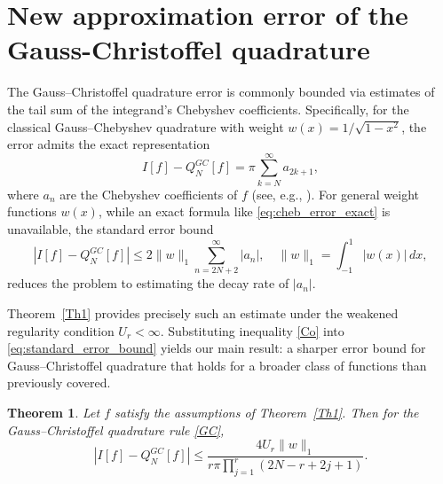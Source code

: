 \documentclass[12pt,a4paper]{article}
\newtheorem{theorem}{Theorem}[section]
\begin{document}
\section{New approximation error of the Gauss-Christoffel quadrature}\label{sec3}
The Gauss--Christoffel quadrature error is commonly bounded via estimates of the tail sum of the integrand's Chebyshev coefficients. Specifically, for the classical Gauss--Chebyshev quadrature with weight $w(x) = 1/\sqrt{1-x^2}$, the error admits the exact representation
\begin{equation}\label{eq:cheb_error_exact}
I[f] - Q_N^{GC}[f] = \pi \sum_{k=N}^{\infty} a_{2k+1},
\end{equation}
where $a_n$ are the Chebyshev coefficients of $f$ (see, e.g., \cite{LN,Rab}). For general weight functions $w(x)$, while an exact formula like \eqref{eq:cheb_error_exact} is unavailable, the standard error bound \cite[Theorem 3.1]{Xi}
\begin{equation}\label{eq:standard_error_bound}
|I[f] - Q_N^{GC}[f]| \leq 2 \|w\|_1 \sum_{n=2N+2}^{\infty} |a_n|, \quad \|w\|_1 = \int_{-1}^{1} |w(x)|\,dx,
\end{equation}
reduces the problem to estimating the decay rate of $|a_n|$.

Theorem~\ref{Th1} provides precisely such an estimate under the weakened regularity condition $U_r < \infty$. Substituting inequality \eqref{Co} into \eqref{eq:standard_error_bound} yields our main result: a sharper error bound for Gauss--Christoffel quadrature that holds for a broader class of functions than previously covered.

\begin{theorem}\label{T2}
    Let $f$ satisfy the assumptions of Theorem~\ref{Th1}. Then for the Gauss--Christoffel quadrature rule \eqref{GC},
    \begin{equation}\label{eq:new_quad_bound}
    |I[f] - Q_N^{GC}[f]| \leq \frac{4U_r \|w\|_1}{r\pi \prod_{j=1}^{r}(2N - r + 2j + 1)}.
    \end{equation}
\end{theorem}
\end{document}
